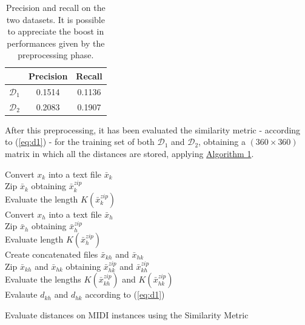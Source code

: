 \documentclass[a4paper]{article}
\begin{document}
	\begin{table}[!h]
		\centering
		\label{tab:stats}
		\begin{tabular}{| c | c | c |}
			\hline
			& Precision & Recall \\ \hline
			$\mathcal{D}_1$ & 0.1514 & 0.1136 \\ 
			$\mathcal{D}_2$ & 0.2083 & 0.1907 \\ 
			\hline
		\end{tabular}
		\caption{Precision and recall on the two datasets. It is possible to appreciate the boost in performances given by the preprocessing phase.}
	\end{table}
	
	After this preprocessing, it has been evaluated the similarity metric - according to (\ref{eq:d1}) - for the training set of both $\mathcal{D}_1$ and $\mathcal{D}_2$, obtaining a $(360 \times 360)$ matrix in which all the distances are stored, applying \hyperref[alg_1]{Algorithm 1}.
	
	\begin{algorithm}[!h]
		{
			Convert $x_k$ into a text file $\bar{x}_k$\\
			Zip $\bar{x}_k$ obtaining $\bar{x}_k^{zip}$\\
			Evaluate the length $K\left(\bar{x}_k^{zip}\right)$\\
			{
				Convert $x_h$ into a text file $\bar{x}_h$\\
				Zip $\bar{x}_h$ obtaining $\bar{x}_h^{zip}$\\
				Evaluate length $K\left(\bar{x}_h^{zip}\right)$\\
				
				\vspace{5px}
				Create concatenated files $\bar{x}_{kh}$ and $\bar{x}_{hk}$\\
				Zip $\bar{x}_{kh}$ and $\bar{x}_{hk}$ obtaining $\bar{x}_{hk}^{zip}$ and $\bar{x}_{kh}^{zip}$\\
				Evaluate the lengths $K\left(\bar{x}_{kh}^{zip}\right)$ and $K\left(\bar{x}_{hk}^{zip}\right)$\\
				\vspace{5px}
				Evalaute $d_{kh}$ and $d_{hk}$ according to (\ref{eq:d1})}}

		\vspace{10px}
		\label{alg_1}
		\caption{Evaluate distances on MIDI instances using the Similarity Metric}
	\end{algorithm}
	
\end{document}

